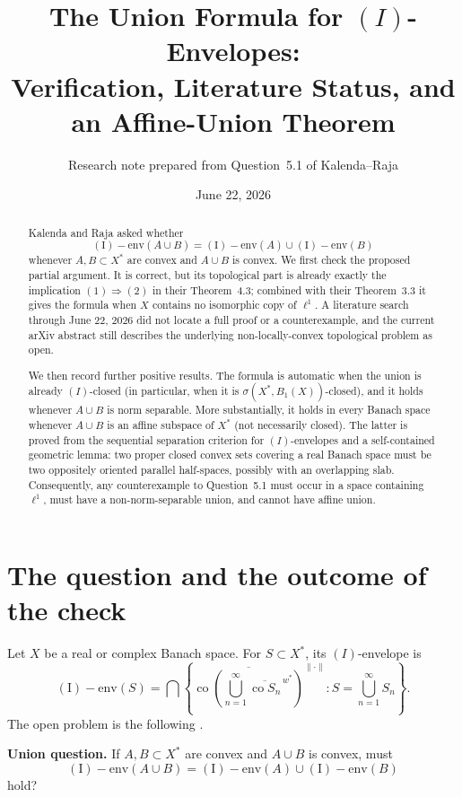 \documentclass[11pt]{article}
\title{The Union Formula for \texorpdfstring{$(I)$}{(I)}-Envelopes:\\
Verification, Literature Status, and an Affine-Union Theorem}
\author{Research note prepared from Question~5.1 of Kalenda--Raja}
\date{June 22, 2026}
\theoremstyle{remark}
\newcommand{\Ienv}{\operatorname{(I)\!\!-env}}
\newcommand{\co}{\operatorname{co}}
\begin{document}
\maketitle

\begin{abstract}
Kalenda and Raja asked whether
\[
 \Ienv(A\cup B)=\Ienv(A)\cup\Ienv(B)
\]
whenever $A,B\subset X^*$ are convex and $A\cup B$ is convex.  We first
check the proposed partial argument.  It is correct, but its topological
part is already exactly the implication $(1)\Rightarrow(2)$ in their
Theorem~4.3; combined with their Theorem~3.3 it gives the formula when $X$
contains no isomorphic copy of $\ell^1$.  A literature search through June
22, 2026 did not locate a full proof or a counterexample, and the current
arXiv abstract still describes the underlying non-locally-convex topological
problem as open.

We then record further positive results.  The formula is automatic when the
union is already $(I)$-closed (in particular, when it is
$\sigma(X^*,B_1(X))$-closed), and it holds whenever $A\cup B$ is norm
separable.  More substantially, it holds in every Banach space whenever
$A\cup B$ is an affine subspace of $X^*$ (not necessarily closed).  The latter is proved from the sequential separation criterion for
$(I)$-envelopes and a self-contained geometric lemma: two proper closed
convex sets covering a real Banach space must be two oppositely oriented
parallel half-spaces, possibly with an overlapping slab.  Consequently, any
counterexample to Question~5.1 must occur in a space containing $\ell^1$,
must have a non-norm-separable union, and cannot have affine union.
\end{abstract}

\section{The question and the outcome of the check}

Let $X$ be a real or complex Banach space.  For $S\subset X^*$, its
$(I)$-envelope is
\[
\Ienv(S)=
\bigcap\left\{
 \overline{\co\!\left(\bigcup_{n=1}^{\infty}
       \overline{\co S_n}^{\,w^*}\right)}^{\|\cdot\|}:
 S=\bigcup_{n=1}^{\infty}S_n
\right\}.
\]
The open problem is the following \cite[Question~5.1]{KR}.

\medskip
\noindent\textbf{Union question.}
If $A,B\subset X^*$ are convex and $A\cup B$ is convex, must
\[
\tag{UF}\label{UF}
 \Ienv(A\cup B)=\Ienv(A)\cup\Ienv(B)
\]
hold?
\end{document}
